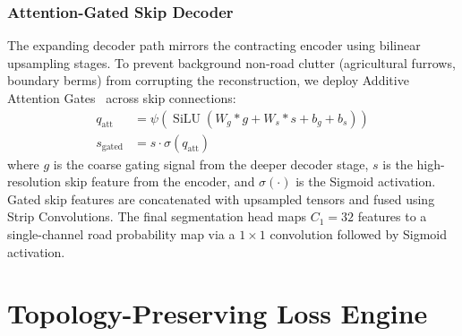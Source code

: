 \documentclass[conference]{IEEEtran}
\begin{document}
\subsubsection{Attention-Gated Skip Decoder}
The expanding decoder path mirrors the contracting encoder using bilinear upsampling stages. To prevent background non-road clutter (agricultural furrows, boundary berms) from corrupting the reconstruction, we deploy Additive Attention Gates~\cite{oktay2018attention} across skip connections:
\begin{align}
    q_{\text{att}} &= \psi\left(\operatorname{SiLU}\left(W_g * g + W_s * s + b_g + b_s\right)\right) \\
    s_{\text{gated}} &= s \cdot \sigma(q_{\text{att}})
\end{align}
where $g$ is the coarse gating signal from the deeper decoder stage, $s$ is the high-resolution skip feature from the encoder, and $\sigma(\cdot)$ is the Sigmoid activation. Gated skip features are concatenated with upsampled tensors and fused using Strip Convolutions. The final segmentation head maps $C_1=32$ features to a single-channel road probability map via a $1\times1$ convolution followed by Sigmoid activation.

\section{Topology-Preserving Loss Engine}
\label{sec:loss}
\end{document}
